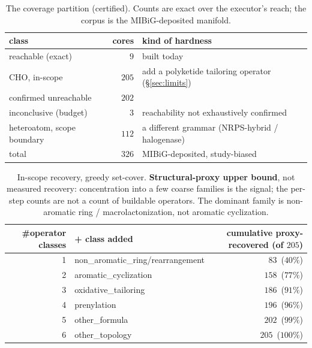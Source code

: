 \documentclass[11pt]{article}
\theoremstyle{definition}
\begin{document}
\begin{table}[h]\centering\small
\begin{tabular}{lrl}
\toprule
class & cores & kind of hardness \\
\midrule
reachable (exact)            & $9$   & built today \\
CHO, in-scope                & $205$ & add a polyketide tailoring operator (\S\ref{sec:limits}) \\
\quad confirmed unreachable  & $202$ & \\
\quad inconclusive (budget)  & $3$   & reachability not exhaustively confirmed \\
heteroatom, scope boundary   & $112$ & a different grammar (NRPS-hybrid / halogenase) \\
\midrule
total                        & $326$ & MIBiG-deposited, study-biased \\
\bottomrule
\end{tabular}
\caption{The coverage partition (certified). Counts are exact over the executor's reach; the corpus is
the MIBiG-deposited manifold.}
\label{app:tab:partition}
\end{table}

\begin{table}[h]\centering\small
\begin{tabular}{rlr}
\toprule
\#operator classes & + class added & cumulative proxy-recovered (of $205$) \\
\midrule
1 & non\_aromatic\_ring/rearrangement  & $83$  \,($40\%$) \\
2 & aromatic\_cyclization              & $158$ \,($77\%$) \\
3 & oxidative\_tailoring               & $186$ \,($91\%$) \\
4 & prenylation                        & $196$ \,($96\%$) \\
5 & other\_formula                     & $202$ \,($99\%$) \\
6 & other\_topology                    & $205$ \,($100\%$) \\
\bottomrule
\end{tabular}
\caption{In-scope recovery, greedy set-cover. \textbf{Structural-proxy upper bound}, not measured
recovery: concentration into a few coarse families is the signal; the per-step counts are not a count of
buildable operators. The dominant family is non-aromatic ring / macrolactonization, not aromatic
cyclization.}
\label{app:tab:cover}
\end{table}
\end{document}
